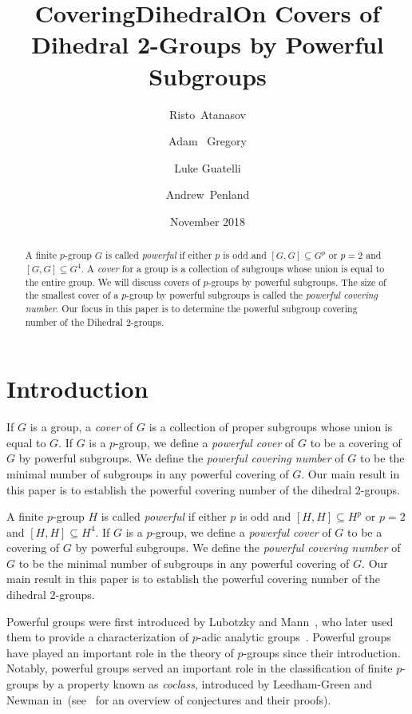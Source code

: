 \documentclass{amsart}
\title{CoveringDihedral}
\author{}
\date{November 2018}
\title[On Covers of Dihedral 2-Groups by Powerful Subgroups]
            {On Covers of Dihedral 2-Groups by Powerful Subgroups}
\author[R.~Atanasov]{Risto~Atanasov}
\author[A.~Gregory]{Adam ~Gregory}
\author[L.~Guatelli]{Luke Guatelli}
\author[A.~Penland]{Andrew~Penland}
\numberwithin{equation} {section}
\theoremstyle{definition}
\begin{document}
\maketitle

\begin{abstract}
A finite $p$-group $G$ is called \textit{powerful} if either $p$ is odd and $[G,G]\subseteq G^p$ or $p=2$ and $[G,G]\subseteq G^4$. A {\em{cover}} for a group is a collection of subgroups whose union is equal to the entire group.   We will discuss covers of $p$-groups by powerful subgroups. The size of the smallest cover of a $p$-group by powerful subgroups is called the \textit{powerful covering number}. Our focus in this paper is to determine the powerful subgroup covering number of the Dihedral 2-groups.
\end{abstract}



\maketitle

\section{Introduction}


If $G$ is a group, a \textit{cover} of $G$ is a collection of proper subgroups whose union is equal to $G$. If $G$ is a $p$-group, we define a \textit{powerful cover} of $G$ to be a covering of $G$ by powerful subgroups. We define the \textit{powerful covering number} of $G$ to be the minimal number of subgroups in any powerful covering of $G$. Our main result in this paper is to establish the powerful covering number of the dihedral $2$-groups. 

A finite $p$-group $H$ is called \textit{powerful} if either $p$ is odd and $[H,H]\subseteq H^p$ or $p=2$ and $[H,H]\subseteq H^4$.
If $G$ is a $p$-group, we define a \textit{powerful cover} of $G$ to be a covering of $G$ by powerful subgroups. We define the \textit{powerful covering number} of $G$ to be the minimal number of subgroups in any powerful covering of $G$. Our main result in this paper is to establish the powerful covering number of the dihedral $2$-groups.
 
Powerful groups were first introduced by Lubotzky and Mann~\cite{Lubotzky1}, who later used them to provide a characterization of $p$-adic analytic groups~\cite{Lubotzky2}. Powerful groups have played an important role in the theory of $p$-groups since their introduction. Notably, powerful groups served an important role in the classification of finite $p$-groups by a property known as \textit{coclass}, introduced by Leedham-Green and Newman in~\cite{Leedham1}(see~\cite{Leedham2} for an overview of conjectures and their proofs). 
\end{document}

